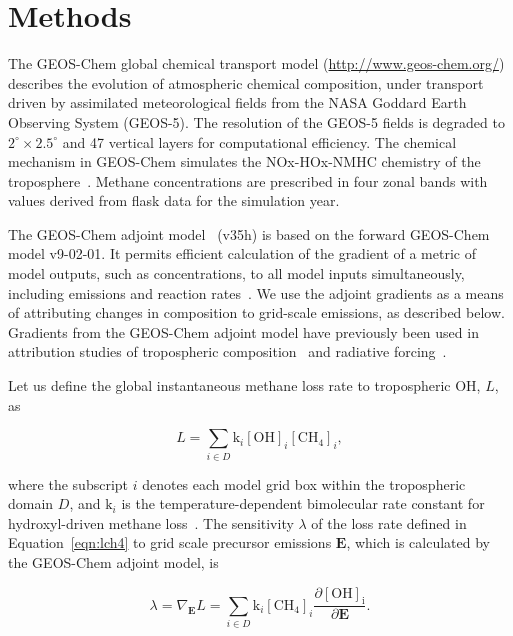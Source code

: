 \section{Methods}

The GEOS-Chem global chemical transport model (\url{http://www.geos-chem.org/}) describes the evolution of atmospheric chemical composition, under transport driven by assimilated meteorological fields from the NASA Goddard Earth Observing System (GEOS-5). The resolution of the GEOS-5 fields is degraded to $2^{\circ} \times 2.5^{\circ}$ and 47 vertical layers for computational efficiency. The chemical mechanism in GEOS-Chem simulates the NOx-HOx-NMHC chemistry of the troposphere~\citep{ref:mao2010}. Methane concentrations are prescribed in four zonal bands with values derived from flask data for the simulation year.

The GEOS-Chem adjoint model~\cite{ref:henze2007} (v35h) is based on the forward GEOS-Chem model v9-02-01. It permits efficient calculation of the gradient of a metric of model outputs, such as concentrations, to all model inputs simultaneously, including emissions and reaction rates~\cite{ref:paulot2012}. We use the adjoint gradients as a means of attributing changes in composition to grid-scale emissions, as described below. Gradients from the GEOS-Chem adjoint model have previously been used in attribution studies of tropospheric composition~\citep{ref:zhang2009,ref:walker2012} and radiative forcing~\citep{ref:bowman2012}.

Let us define the global instantaneous methane loss rate to tropospheric OH, $L$, as

\begin{equation}
L=\sum_{i \in D} \mathrm{k}_i \mathrm{[OH]}_i \mathrm{[CH_4]}_i,
\label{eqn:lch4}
\end{equation}

where the subscript $i$ denotes each model grid box within the tropospheric domain $D$, and $\mathrm{k}_i$ is the temperature-dependent bimolecular rate constant for hydroxyl-driven methane loss~\citep{ref:sander2011}. The sensitivity $\lambda$ of the loss rate defined in Equation~\ref{eqn:lch4} to grid scale precursor emissions $\mathbf{E}$, which is calculated by the GEOS-Chem adjoint model, is

\begin{equation}
\lambda = \nabla_\mathbf{E} L = \sum_{i \in D} \mathrm{k}_i \mathrm{[CH_4]}_i \frac{\partial \mathrm{[OH]_i}}{\partial \mathbf{E}}.
\label{eqn:dlde}
\end{equation}


